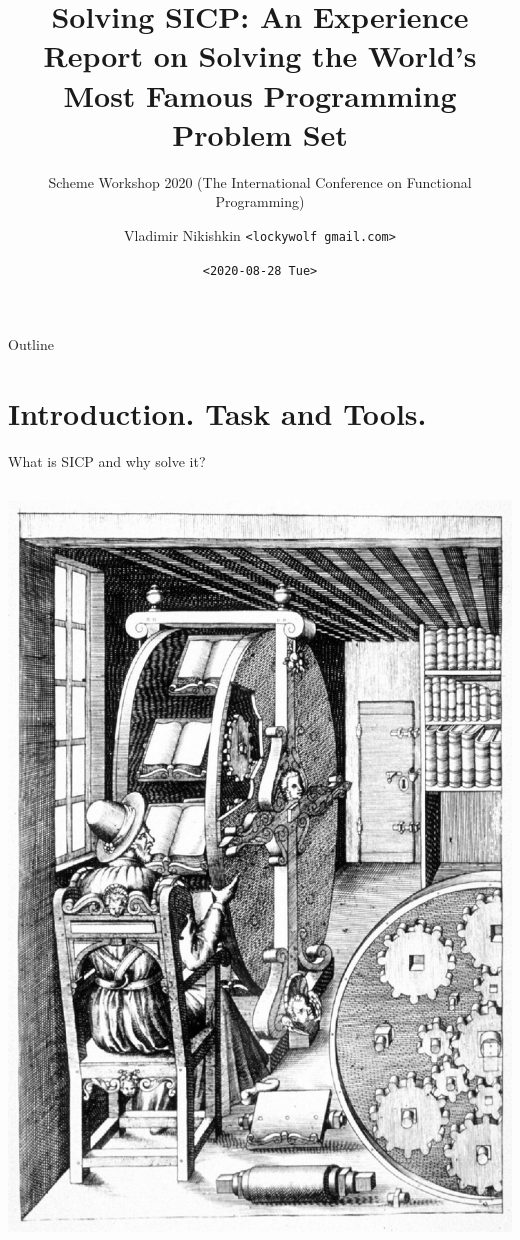 \documentclass[presentation, CJK, compress,aspectratio=169]{beamer}
\author{Vladimir Nikishkin \newline \texttt{<lockywolf gmail.com>}}
\date{\texttt{<2020-08-28 Tue>}}
\title{Solving SICP: An Experience Report on Solving the World's Most Famous Programming Problem Set}
\subtitle{Scheme Workshop 2020 \newline (The International Conference on Functional Programming)}
\begin{document}
\maketitle
\begin{frame}{Outline}
\tableofcontents
\end{frame}


\section{Introduction. Task and Tools.}
\label{sec:org62ccca4}

\begin{frame}[label={sec:org6ccb8da}]{What is SICP and why solve it?}
\begin{columns}
\begin{column}{0.35\columnwidth}
\begin{center}
\includegraphics[width=.9\linewidth]{bookwheel.jpg}
\end{center}
\end{column}


\end{columns}
\end{frame}
\end{document}
